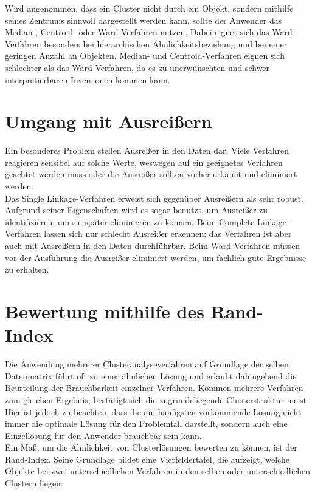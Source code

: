 Wird angenommen, dass ein Cluster nicht durch ein Objekt, sondern mithilfe seines Zentrums sinnvoll dargestellt werden kann, sollte der Anwender das Median-, Centroid- oder Ward-Verfahren nutzen. Dabei eignet sich das Ward-Verfahren besonders bei hierarchischen Ähnlichkeitsbeziehung und bei einer geringen Anzahl an Objekten. Median- und Centroid-Verfahren eignen sich schlechter als das Ward-Verfahren, da es zu unerwünschten und schwer interpretierbaren Inversionen kommen kann. \citep[Vgl.][S. 295]{Bacher.2010}

\section{Umgang mit Ausreißern}

Ein besonderes Problem stellen Ausreißer in den Daten dar. Viele Verfahren reagieren sensibel auf solche Werte, weswegen auf ein geeignetes Verfahren geachtet werden muss oder die Ausreißer sollten vorher erkannt und eliminiert werden. \\
Das Single Linkage-Verfahren erweist sich gegenüber Ausreißern als sehr robust. Aufgrund seiner Eigenschaften wird es sogar benutzt, um Ausreißer zu identifizieren, um sie später eliminieren zu können. Beim Complete Linkage-Verfahren lassen sich nur schlecht Ausreißer erkennen; das Verfahren ist aber auch mit Ausreißern in den Daten durchführbar. Beim Ward-Verfahren müssen vor der Ausführung die Ausreißer eliminiert werden, um fachlich gute Ergebnisse zu erhalten.

\section{Bewertung mithilfe des Rand-Index}

Die Anwendung mehrerer Clusteranalyseverfahren auf Grundlage der selben Datenmatrix führt oft zu einer ähnlichen Lösung und erlaubt dahingehend die Beurteilung der Brauchbarkeit einzelner Verfahren. Kommen mehrere Verfahren zum gleichen Ergebnis, bestätigt sich die zugrundeliegende Clusterstruktur meist. Hier ist jedoch zu beachten, dass die am häufigsten vorkommende Lösung nicht immer die optimale Lösung für den Problemfall darstellt, sondern auch eine Einzellösung für den Anwender brauchbar sein kann. \\
Ein Maß, um die Ähnlichkeit von Clusterlösungen bewerten zu können, ist der Rand-Index. Seine Grundlage bildet eine Vierfeldertafel, die aufzeigt, welche Objekte bei zwei unterschiedlichen Verfahren in den selben oder unterschiedlichen Clustern liegen:

